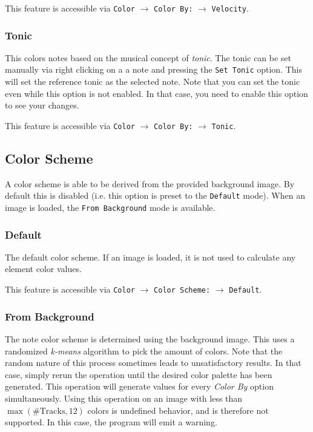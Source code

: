 \documentclass[english]{article}
\providecommand{\mi}[1]{\texttt{#1}}
\begin{document}
This feature is accessible via 
\mi{Color} $\rightarrow$ \mi{Color By:} $\rightarrow$ \mi{Velocity}.

\subsubsection{Tonic}

This colors notes based on the musical concept of \textit{tonic}. The tonic can be set manually via right clicking on a
a note and pressing the \mi{Set Tonic} option. This will set the reference tonic as the selected note. Note that you 
can set the tonic even while this option is not enabled. In that case, you need to enable this option to see your changes.

This feature is accessible via 
\mi{Color} $\rightarrow$ \mi{Color By:} $\rightarrow$ \mi{Tonic}.

\subsection{Color Scheme}

A color scheme is able to be derived from the provided background image. By default this is disabled (i.e.
this option is preset to the \mi{Default} mode). When an image is loaded, the \mi{From Background} mode is available.

\subsubsection{Default}

The default color scheme. If an image is loaded, it is not used to calculate any element color values.

This feature is accessible via 
\mi{Color} $\rightarrow$ \mi{Color Scheme:} $\rightarrow$ \mi{Default}.

\subsubsection{From Background}

The note color scheme is determined using the background image. This uses a randomized \textit{k-means} algorithm
to pick the amount of colors. Note that the random nature of this process sometimes leads to unsatisfactory results.
In that case, simply rerun the operation until the desired color palette has been generated. This operation will
generate values for every \textit{Color By} option simultaneously. Using this operation on an image with less
than $\max(\text{\# Tracks}, 12)$ colors is undefined behavior, and is therefore not supported. In this case,
the program will emit a warning.
\end{document}
